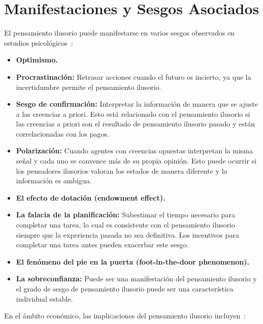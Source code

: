 \documentclass[12pt, a4paper, twoside]{article}
\begin{document}
\section{Manifestaciones y Sesgos Asociados}

El pensamiento ilusorio puede manifestarse en varios sesgos observados en estudios psicológicos~\cite{caplin2019wishful}:

\begin{itemize}
    \item \textbf{Optimismo.}
    \item \textbf{Procrastinación:} Retrasar acciones cuando el futuro es incierto, ya que la incertidumbre permite el pensamiento ilusorio.
    \item \textbf{Sesgo de confirmación:} Interpretar la información de manera que se ajuste a las creencias a priori. Esto está relacionado con el 
    pensamiento ilusorio si las creencias a priori son el resultado de pensamiento ilusorio pasado y están correlacionadas con los pagos.
    \item \textbf{Polarización:} Cuando agentes con creencias opuestas interpretan la misma señal y cada uno se convence más de su propia opinión. 
    Esto puede ocurrir si los pensadores ilusorios valoran los estados de manera diferente y la información es ambigua.
    \item \textbf{El efecto de dotación (endowment effect).}
    \item \textbf{La falacia de la planificación:} Subestimar el tiempo necesario para completar una tarea, lo cual es consistente con el pensamiento 
    ilusorio siempre que la experiencia pasada no sea definitiva. Los incentivos para completar una tarea antes pueden exacerbar este sesgo.
    \item \textbf{El fenómeno del pie en la puerta (foot-in-the-door phenomenon).}
    \item \textbf{La sobreconfianza:} Puede ser una manifestación del pensamiento ilusorio y el grado de sesgo de pensamiento ilusorio puede ser 
    una característica individual estable.
\end{itemize}

En el ámbito económico, las implicaciones del pensamiento ilusorio incluyen~\cite{caplin2019wishful}:
\end{document}
